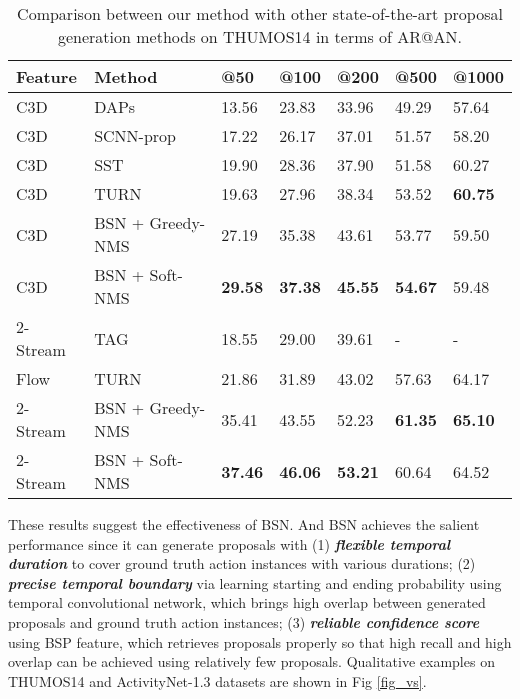 \documentclass[runningheads]{llncs}
\begin{document}
\begin{table}[tbp]
\setlength{\abovecaptionskip}{-0.05cm} %
\setlength{\belowcaptionskip}{0.1cm} %
\centering
\caption{ Comparison between our method with other state-of-the-art  proposal generation methods on  THUMOS14 in terms of AR@AN.} %
\begin{tabular}{m{1.9cm}<{\centering}m{3.1cm}m{1.2cm}<{\centering}m{1.2cm}<{\centering}m{1.2cm}<{\centering}m{1.2cm}<{\centering}m{1.2cm}<{\centering}}
\toprule
Feature & Method  		& @50 & @100  & @200 & @500 & @1000    \\
\hline
C3D & DAPs \cite{escorcia2016daps} 		& 13.56	& 23.83 &  33.96 & 49.29 & 57.64   \\
C3D & SCNN-prop \cite{shou2016action} 	& 17.22 & 26.17 &  37.01 & 51.57 & 58.20   \\
C3D & SST \cite{sst_buch_cvpr17}			& 19.90 & 28.36  &  37.90 & 51.58 & 60.27   \\
C3D & TURN \cite{gao2017turn} 			& 19.63 & 27.96 &  38.34 & 53.52 & {\bf 60.75}  \\
\hline
C3D & BSN + Greedy-NMS 	& 27.19 & 35.38 &  43.61 &  53.77  & 59.50   \\
C3D & BSN + Soft-NMS	& {\bf 29.58} & {\bf 37.38} &  {\bf 45.55} & {\bf 54.67} & 59.48   \\
\hline
\hline
2-Stream & TAG \cite{zhao2017temporal} 		& 18.55 & 29.00  &  39.61 & - & -  \\
Flow & TURN \cite{gao2017turn} 		& 21.86 & 31.89 & 43.02 & 57.63  & 64.17  \\
\hline
2-Stream & BSN + Greedy-NMS & 	 35.41 & 43.55 &  52.23 & {\bf 61.35} & {\bf 65.10 } \\
2-Stream & BSN + Soft-NMS & {\bf 37.46} & {\bf 46.06} &  {\bf 53.21} & 60.64 &  64.52   \\
\bottomrule
\end{tabular}
\label{table_comparison_2}
\vspace{-0.4cm}
\end{table}







These results suggest the effectiveness of BSN. And BSN achieves the salient performance since it can generate proposals with (1) {\bf \emph{flexible temporal duration}} to cover ground truth action instances with various durations; (2) {\bf \emph{precise temporal boundary}} via learning starting and ending probability using temporal convolutional network, which brings high overlap between generated proposals and ground truth action instances; (3) {\bf \emph{reliable confidence score}} using BSP feature, which retrieves proposals properly so that high recall and high overlap can be achieved using relatively few proposals.
Qualitative examples on  THUMOS14 and ActivityNet-1.3 datasets are shown in Fig \ref{fig_vs}.
\end{document}
